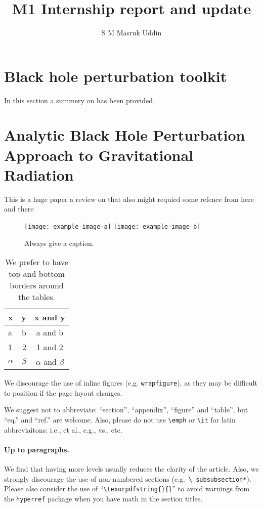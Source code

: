 \documentclass[a4paper,11pt]{article}
\title{\boldmath M1 Internship report and update}
\author{S M Masruk Uddin}
\affiliation{LUTH, L’Observatoire de Paris-PSL\\
5 place Jules Janssen, 92195 Meudon}
\begin{document}
\maketitle
\flushbottom

\section{Black hole perturbation toolkit }
\label{BHPTK}
In this section a summery on \cite{PhysRevD.73.024027}  has been provided. 



\section{Analytic Black Hole Perturbation Approach to Gravitational Radiation}
 This is a huge paper \cite{Sasaki2003} a review on that also might requied  some refence from here and there 
\begin{figure}[htbp]
\centering
\texttt{[image: example-image-a]}
\qquad
\texttt{[image: example-image-b]}
\caption{Always give a caption.\label{fig:i}}
\end{figure}

\begin{table}[htbp]
\centering
\begin{tabular}{lr|c}
\hline
x&y&x and y\\
\hline
a & b & a and b\\
1 & 2 & 1 and 2\\
$\alpha$ & $\beta$ & $\alpha$ and $\beta$\\
\hline
\end{tabular}
\caption{We prefer to have top and bottom borders around the tables.\label{tab:i}}
\end{table}

We discourage the use of inline figures (e.g. \texttt{wrapfigure}), as they may be
difficult to position if the page layout changes.

We suggest not to abbreviate: ``section'', ``appendix'', ``figure''
and ``table'', but ``eq.'' and ``ref.'' are welcome. Also, please do
not use \texttt{\textbackslash emph} or \texttt{\textbackslash it} for
latin abbreviaitons: i.e., et al., e.g., vs., etc.


\paragraph{Up to paragraphs.} We find that having more levels usually
reduces the clarity of the article. Also, we strongly discourage the
use of non-numbered sections (e.g.~\texttt{\textbackslash
  subsubsection*}).  Please also consider the use of
``\texttt{\textbackslash texorpdfstring\{\}\{\}}'' to avoid warnings
from the \texttt{hyperref} package when you have math in the section titles.
\end{document}

